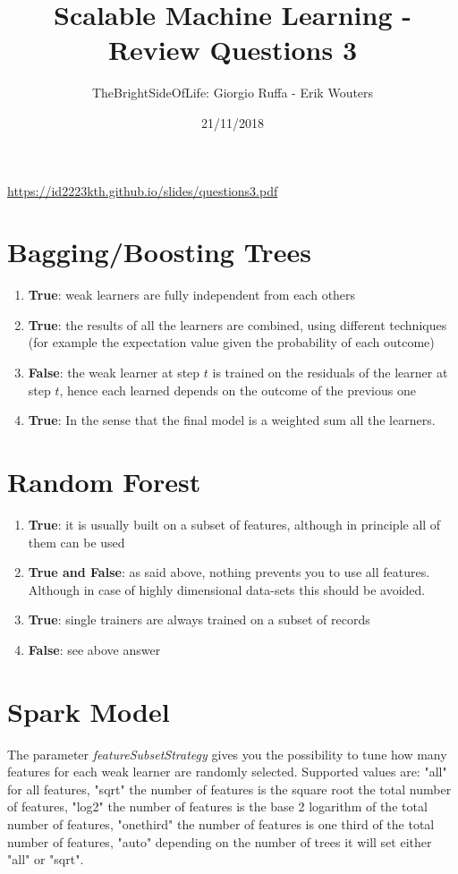\documentclass[a4paper]{article}
\title{Scalable Machine Learning - Review Questions 3}
\author{TheBrightSideOfLife: Giorgio Ruffa - Erik Wouters}
\date{21/11/2018}
\begin{document}
\maketitle

\url{https://id2223kth.github.io/slides/questions3.pdf}

\section{Bagging/Boosting Trees}
\begin{enumerate}[label=(\alph*)]
    \item \textbf{True}: weak learners are fully independent from each others
    \item \textbf{True}: the results of all the learners are combined, using different techniques (for example the expectation value given the probability of each outcome)
    \item \textbf{False}: the weak learner at step $t$ is trained on the residuals of the learner at step $t$, hence each learned depends on the outcome of the previous one
    \item \textbf{True}: In the sense that the final model is a weighted sum all the learners.
\end{enumerate}
\section{Random Forest}
\begin{enumerate}[label=(\alph*)]
    \item \textbf{True}: it is usually built on a subset of features, although in principle all of them can be used
    \item \textbf{True and False}: as said above, nothing prevents you to use all features. Although in case of highly dimensional data-sets this should be avoided.
    \item \textbf{True}: single trainers are always trained on a subset of records
    \item \textbf{False}: see above answer
\end{enumerate}

\section{Spark Model}
The parameter \textit{featureSubsetStrategy} gives you the possibility to tune how many features for each weak learner are randomly selected.
Supported values are:  "all" for all features, "sqrt" the number of features is the square root the total number of features, "log2" the number of features is the base 2 logarithm of the total number of features, "onethird" the number of features is one third of the total number of features, "auto" depending on the number of trees it will set either "all" or "sqrt".
\end{document}
